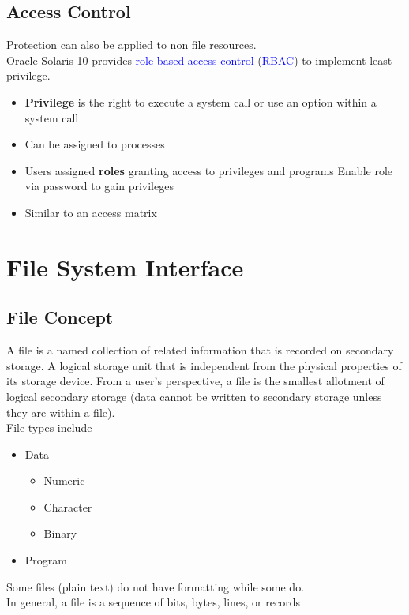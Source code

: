 \documentclass[oneside]{book}
\begin{document}
            \subsection{Access Control}
                Protection can also be applied to non file resources.\\
                Oracle Solaris 10 provides \textcolor{blue}{role-based access control} (\textcolor{blue}{RBAC})
                to implement least privilege.\\
                \begin{itemize}
                    \item \textbf{Privilege} is the right to execute a system call or use an option within a system call
                    \item Can be assigned to processes
                    \item Users assigned \textbf{roles} granting access to privileges and programs
                        \subitem Enable role via password to gain privileges
                    \item Similar to an access matrix
                \end{itemize}
        \section{File System Interface}
            \subsection{File Concept}
                A file is a named collection of related information that is recorded on secondary storage.
                A logical storage unit that is independent from the physical properties of its storage device.
                From a user's perspective, a file is the smallest allotment of logical secondary storage (data cannot
                be written to secondary storage unless they are within a file).\\
                File types include
                \begin{itemize}
                    \item Data
                        \begin{itemize}
                            \item Numeric
                            \item Character
                            \item Binary
                        \end{itemize}
                    \item Program
                \end{itemize}
                Some files (plain text) do not have formatting while some do.\\
                In general, a file is a sequence of bits, bytes, lines, or records
\end{document}
